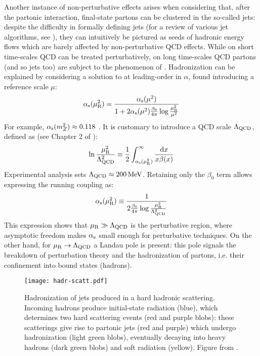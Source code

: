 Another instance of non-perturbative effects arises when considering that, after the partonic interaction, final-state partons can be clustered in the so-called jets: despite the difficulty in formally defining jets (for a review of various jet algorithms, see \cite{Salam-2010}), they can intuitively be pictured as seeds of hadronic energy flows which are barely affected by non-perturbative QCD effects. While on short time-scales QCD can be treated perturbatively, on long time-scales QCD partons (and so jets too) are subject to the phenomenon of . Hadronization can be explained by considering a solution to  at leading-order in $ \alpha $, found introducing a reference scale $ \mu $:
\begin{equation}
  \alpha_\text{s}(\mu_\text{R}^2) = \frac{\alpha_\text{s}(\mu^2)}{1 + 2 \alpha_\text{s}(\mu^2) \frac{\beta_0}{4\pi} \log \frac{\mu_\text{R}^2}{\mu^2}}
\end{equation}
For example, $ \alpha_\text{s}(m_Z^2) \approx 0.118 $ \cite{PDG-2024}. It is customary to introduce a QCD scale $ \Lambda_\text{QCD} $, defined as (see Chapter 2 of \cite{Ellis-1996}):
\begin{equation}
  \ln \frac{\mu_\text{R}^2}{\Lambda_\text{QCD}^2} \equiv \frac{1}{2} \int_{\alpha_\text{s}(\mu_\text{R}^2)}^\infty \frac{\mathrm{d} x}{x \beta(x)}
\end{equation}
Experimental analysis sets $ \Lambda_\text{QCD} \approx 200\,\mathrm{MeV} $. Retaining only the $ \beta_0 $ term allows expressing the running coupling as:
\begin{equation}
  \alpha_\text{s}(\mu_\text{R}^2) \equiv \frac{1}{2\frac{\beta_0}{4\pi} \log \frac{\mu_\text{R}^2}{\Lambda_\text{QCD}^2}}
\end{equation}
This expression shows that $ \mu_\text{R} \gg \Lambda_\text{QCD} $ is the perturbative region, where asymptotic freedom makes $ \alpha_\text{s} $ small enough for perturbative techniques. On the other hand, for $ \mu_\text{R} \rightarrow \Lambda_\text{QCD} $ a Landau pole is present: this pole signals the breakdown of perturbation theory and the hadronization of partons, i.e. their confinement into bound states (hadrons).

\begin{figure}
  \centering
  \texttt{[image: hadr-scatt.pdf]}
  \caption{Hadronization of jets produced in a hard hadronic scattering. Incoming hadrons produce initial-state radiation (blue), which determines two hard scattering events (red and purple blobs): these scatterings give rise to partonic jets (red and purple) which undergo hadronization (light green blobs), eventually decaying into heavy hadrons (dark green blobs) and soft radiation (yellow). Figure from \cite{Hoche-2014}.}
  \label{fig:hadr-scatt}
\end{figure}

